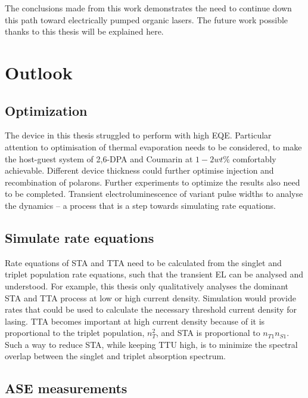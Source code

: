 \documentclass[
  letterpaper,
  DIV=11,
  numbers=noendperiod,
  oneside]{scrreprt}
\begin{document}
The conclusions made from this work demonstrates the need to continue
down this path toward electrically pumped organic lasers. The future
work possible thanks to this thesis will be explained here.

\hypertarget{outlook}{%
\section{Outlook}\label{outlook}}

\hypertarget{optimization}{%
\subsection{Optimization}\label{optimization}}

The device in this thesis struggled to perform with high EQE. Particular
attention to optimisation of thermal evaporation needs to be considered,
to make the host-guest system of 2,6-DPA and Coumarin at \(1-2wt\%\)
comfortably achievable. Different device thickness could further
optimise injection and recombination of polarons. Further experiments to
optimize the results also need to be completed. Transient
electroluminescence of variant pulse widths to analyse the dynamics -- a
process that is a step towards simulating rate equations.

\hypertarget{simulate-rate-equations}{%
\subsection{Simulate rate equations}\label{simulate-rate-equations}}

Rate equations of STA and TTA need to be calculated from the singlet and
triplet population rate equations, such that the transient EL can be
analysed and understood. For example, this thesis only qualitatively
analyses the dominant STA and TTA process at low or high current
density. Simulation would provide rates that could be used to calculate
the necessary threshold current density for lasing. TTA becomes
important at high current density because of it is proportional to the
triplet population, \(n_T^2\), and STA is proportional to
\(n_{T1}n_{S1}\). Such a way to reduce STA, while keeping TTU high, is
to minimize the spectral overlap between the singlet and triplet
absorption spectrum.

\hypertarget{ase-measurements}{%
\subsection{ASE measurements}\label{ase-measurements}}
\end{document}
